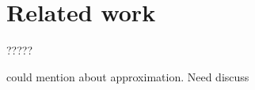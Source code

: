 \section{Related work}
\label{section:relatedwork}

?????

could mention about approximation. Need discuss